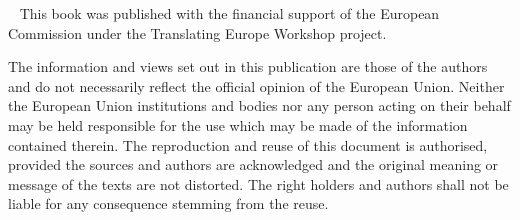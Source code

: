 ~
\vfill
\noindent
This book was published with the financial support of the European Commission under the Translating Europe Workshop project. 

The information and views set out in this publication are those of the authors and do not necessarily reflect the official opinion of the European Union. Neither the European Union institutions and bodies nor any person acting on their behalf may be held responsible for the use which may be made of the information contained therein. The reproduction and reuse of this document is
authorised, provided the sources and authors are acknowledged and the original meaning or message of the texts are not distorted. The right holders and authors shall not be liable for any consequence stemming from the reuse. 
